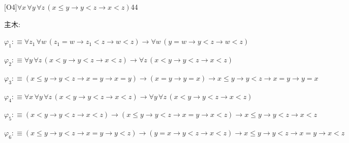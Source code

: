 \begin{fullproof}{[O4]}{$\forall x\,\forall y\,\forall z\,(x \leq y \to y < z \to x < z)$}{44}
\begin{ptree}
\end{ptree}
\noindent 主木:
\begin{ptree}
\noLine
{}
\noLine
{}
\noLine
{}
\noLine
{}
\end{ptree}
\begin{abbrevlist}
\item $\varphi_{1} :\equiv \forall z_{1}\,\forall w\,(z_{1} = w \to z_{1} < z \to w < z) \to \forall w\,(y = w \to y < z \to w < z)$
\item $\varphi_{2} :\equiv \forall y\,\forall z\,(x < y \to y < z \to x < z) \to \forall z\,(x < y \to y < z \to x < z)$
\item $\varphi_{3} :\equiv (x \leq y \to y < z \to x = y \to x = y) \to (x = y \to y = x) \to x \leq y \to y < z \to x = y \to y = x$
\item $\varphi_{4} :\equiv \forall x\,\forall y\,\forall z\,(x < y \to y < z \to x < z) \to \forall y\,\forall z\,(x < y \to y < z \to x < z)$
\item $\varphi_{5} :\equiv (x < y \to y < z \to x < z) \to (x \leq y \to y < z \to x = y \to x < z) \to x \leq y \to y < z \to x < z$
\item $\varphi_{6} :\equiv (x \leq y \to y < z \to x = y \to y < z) \to (y = x \to y < z \to x < z) \to x \leq y \to y < z \to x = y \to x < z$
\end{abbrevlist}
\end{fullproof}
